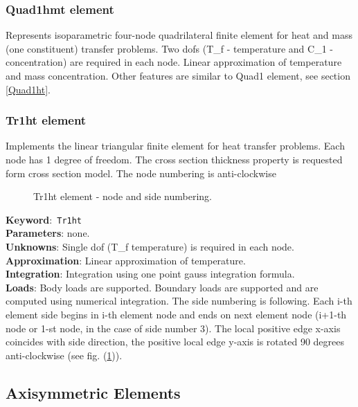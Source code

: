 \documentclass[a4paper]{article}
\newcommand{\descitem}[1]{{\noindent \textbf{#1}}:}
\newcommand{\elemkeyword}[1]{\descitem{Keyword}~\param{#1}} %
\newcommand{\param}[1]{\texttt{#1}} %
\begin{document}
\subsubsection{Quad1hmt element}
Represents isoparametric four-node quadrilateral finite element for
heat and mass (one constituent) transfer problems. 
Two dofs (T\_f - temperature and C\_1 - concentration) are required in
each node. Linear approximation of temperature and mass concentration.
Other features are similar to Quad1 element, see section \ref{Quad1ht}.

\subsubsection{Tr1ht element}
\label{Tr1ht}
Implements the linear triangular finite element for heat transfer problems. Each node has 1 degree of freedom.
The cross section thickness property is requested form cross section model.
The node numbering is anti-clockwise

\begin{figure}[htb]
 \centering
 \begin{makeimage}
  
 \end{makeimage}
 \caption{Tr1ht element - node and side numbering.}
 \label{Tr1htfig}
\end{figure}

\elemkeyword{Tr1ht}\\
\descitem{Parameters} none.\\
\descitem{Unknowns} Single dof (T\_f temperature) is  required in each node.\\
\descitem{Approximation} Linear approximation of temperature.\\
\descitem{Integration} Integration using one point gauss integration formula.\\
\descitem{Loads} Body loads are supported. Boundary loads are
supported and are computed  using numerical integration. The side numbering is
following. Each i-th element side begins in i-th element node and
ends on next element node (i+1-th node or 1-st node, in the case of 
side number 3). The local positive edge x-axis coincides with side
direction, the positive local edge y-axis is rotated 90 degrees
anti-clockwise (see fig. (\ref{Tr1htfig})).


\clearpage
\subsection{Axisymmetric Elements}
\end{document}

